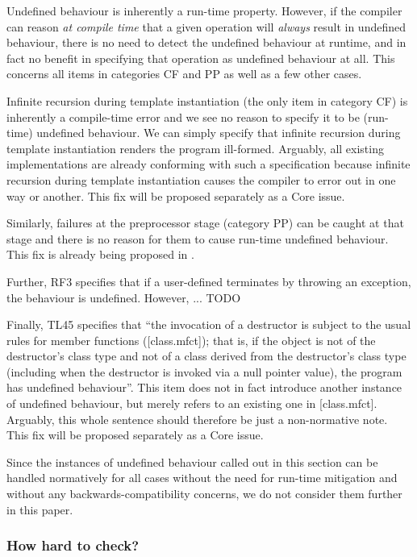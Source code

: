 Undefined behaviour is inherently a run-time property. However, if the compiler can reason \emph{at compile time} that a given operation will \emph{always} result in undefined behaviour, there is no need to detect the undefined behaviour at runtime, and in fact no benefit in specifying that operation as undefined behaviour at all. This concerns all items in categories CF and PP as well as a few other cases.

Infinite recursion during template instantiation (the only item in category CF) is inherently a compile-time error and we see no reason to specify it to be (run-time) undefined behaviour. We can simply specify that infinite recursion during template instantiation renders the program ill-formed. Arguably, all existing implementations are already conforming with such a specification because infinite recursion during template instantiation causes the compiler to error out in one way or another. This fix will be proposed separately as a Core issue.

Similarly, failures at the preprocessor stage (category PP) can be caught at that stage and there is no reason for them to cause run-time undefined behaviour. This fix is already being proposed in \cite{P2843R0}.

Further, RF3 specifies that if a user-defined  terminates by throwing an exception, the behaviour is undefined. However, ... TODO %

Finally, TL45 specifies that ``the invocation of a destructor is subject to the usual rules for member functions ([class.mfct]); that is, if the object is not of the destructor's class type and not of a class derived from the destructor's class type (including when the destructor is invoked via a null pointer value), the program has undefined behaviour''. This item does not in fact introduce another instance of undefined behaviour, but merely refers to an existing one in [class.mfct]. Arguably, this whole sentence should therefore be just a non-normative note. This fix will be proposed separately as a Core issue.

Since the instances of undefined behaviour called out in this section can be handled normatively for all cases without the need for run-time mitigation and without any backwards-compatibility concerns, we do not consider them further in this paper.

\subsubsection{How hard to check?}

